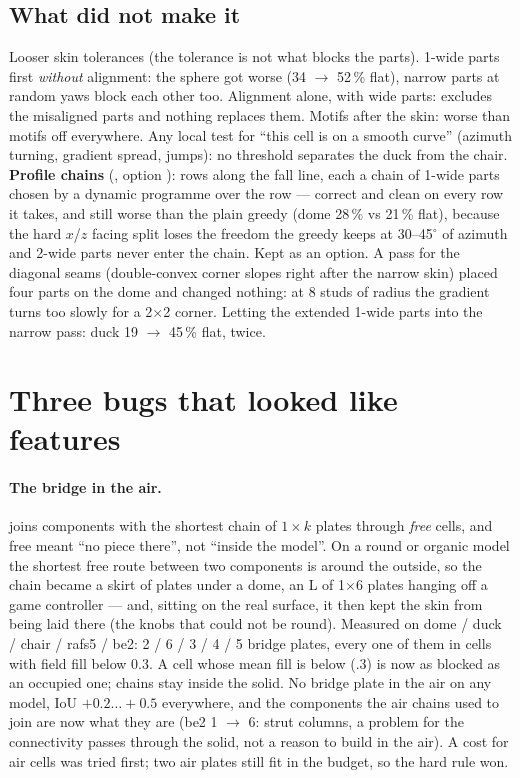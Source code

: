 \subsection{What did not make it}
Looser skin tolerances (the tolerance is not what blocks the parts). 1-wide parts first \emph{without} alignment: the sphere
got worse (34 $\to$ 52\,\% flat), narrow parts at random yaws block each other too. Alignment alone, with wide parts: excludes
the misaligned parts and nothing replaces them. Motifs after the skin: worse than motifs off everywhere. Any local test for
``this cell is on a smooth curve'' (azimuth turning, gradient spread, jumps): no threshold separates the duck from the chair.
\textbf{Profile chains} (, option ): rows along the fall line, each a chain of 1-wide parts chosen by
a dynamic programme over the row --- correct and clean on every row it takes, and still worse than the plain greedy (dome 28\,\% vs
21\,\% flat), because the hard $x$/$z$ facing split loses the freedom the greedy keeps at 30--45$^\circ$ of azimuth and 2-wide
parts never enter the chain. Kept as an option. A pass for the diagonal seams (double-convex corner slopes right after the narrow
skin) placed four parts on the dome and changed nothing: at 8 studs of radius the gradient turns too slowly for a 2$\times$2
corner. Letting the extended 1-wide parts into the narrow pass: duck 19 $\to$ 45\,\% flat, twice.

\section{Three bugs that looked like features}\label{sec:round7}
\paragraph{The bridge in the air.}  joins components with the shortest chain of $1\times k$ plates through
\emph{free} cells, and free meant ``no piece there'', not ``inside the model''. On a round or organic model the shortest free
route between two components is around the outside, so the chain became a skirt of plates under a dome, an L of 1$\times$6
plates hanging off a game controller --- and, sitting on the real surface, it then kept the skin from being laid there (the knobs
that could not be round). Measured on dome / duck / chair / rafs5 / be2: 2 / 6 / 3 / 4 / 5 bridge plates, every one of them in
cells with field fill below 0.3. A cell whose mean fill is below  ($.3$) is now as blocked as an occupied one;
chains stay inside the solid. No bridge plate in the air on any model, IoU $+0.2 \ldots +0.5$ everywhere, and the components the
air chains used to join are now what they are (be2 1 $\to$ 6: strut columns, a problem for the connectivity passes through the
solid, not a reason to build in the air). A cost for air cells was tried first; two air plates still fit in the budget, so the
hard rule won.

